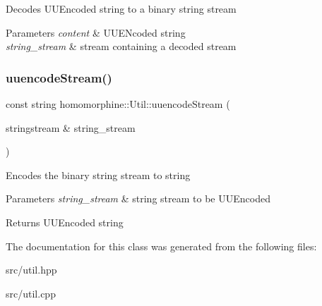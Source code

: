 Decodes U\+U\+Encoded string to a binary string stream


\begin{DoxyParams}{Parameters}
{\em content} & U\+U\+E\+Ncoded string \\
\hline
{\em string\+\_\+stream} & stream containing a decoded stream \\
\hline
\end{DoxyParams}
\mbox{\label{classhomomorphine_1_1_util_a26f29995aa48f4374993ec4afeca2ac8}} 
\subsubsection{\texorpdfstring{uuencodeStream()}{uuencodeStream()}}
{\footnotesize\ttfamily const string homomorphine\+::\+Util\+::uuencode\+Stream (\begin{DoxyParamCaption}\item[{stringstream \&}]{string\+\_\+stream }\end{DoxyParamCaption})\hspace{0.3cm}{\ttfamily [static]}}

Encodes the binary string stream to string


\begin{DoxyParams}{Parameters}
{\em string\+\_\+stream} & string stream to be U\+U\+Encoded \\
\hline
\end{DoxyParams}
\begin{DoxyReturn}{Returns}
U\+U\+Encoded string 
\end{DoxyReturn}


The documentation for this class was generated from the following files\+:\begin{DoxyCompactItemize}
\item 
src/util.\+hpp\item 
src/util.\+cpp\end{DoxyCompactItemize}
